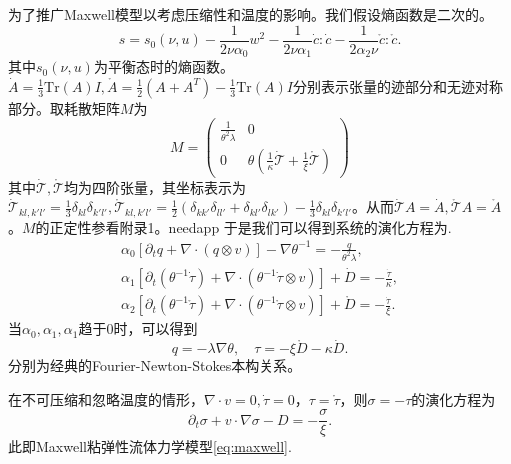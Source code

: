 \documentclass{article}
\begin{document}
	为了推广Maxwell模型以考虑压缩性和温度的影响。我们假设熵函数是二次的。
	\begin{equation*}
		s = s_0(\nu,u)  - \frac{1}{2\nu \alpha_0} w^2 - \frac{1}{2\nu \alpha_1} \dot{c}:\dot{c}- \frac{1}{2\alpha_2 \nu} \mathring{c}:\mathring{c}.
	\end{equation*}
	其中$s_0(\nu,u)$为平衡态时的熵函数。$\dot{A} = \frac{1}{3} \mbox{Tr} (A)I, \mathring{A} = \frac{1}{2} (A + A^T) - \frac{1}{3} \mbox{Tr} (A) I$分别表示张量的迹部分和无迹对称部分。取耗散矩阵$M$为
	\begin{equation*}
		M = \left( \begin{array}{ccc} 
			\frac{1}{\theta^2 \lambda} & 0 \\
			0 &  \theta(\frac{1}{\kappa} \dot{\mathcal{T}} + \frac{1}{\xi} \mathring{\mathcal{T}})  
		\end{array} \right)
	\end{equation*}
	其中$\dot{\mathcal{T}}, \mathring{\mathcal{T}}$均为四阶张量，其坐标表示为$\dot{\mathcal{T}}_{kl,k'l'} = \frac{1}{3}\delta_{kl} \delta_{k'l'}, \mathring{\mathcal{T}}_{kl,k'l'} =\frac{1}{2}(\delta_{kk'}\delta_{ll'} + \delta_{kl'} \delta_{lk'} ) -\frac{1}{3}\delta_{kl} \delta_{k'l'} $。从而$\dot{\mathcal{T}} A = \dot{A},\mathring{\mathcal{T}} A = \mathring{A}$。$M$的正定性参看附录1。needapp
	于是我们可以得到系统的演化方程为\cite{}.
	\begin{subequations}
		\begin{align}
			\alpha_0 [\partial_t q +  \nabla \cdot (q \otimes v)] - \nabla \theta^{-1} = -\frac{q}{\theta^2 \lambda}, \\
			\alpha_1[\partial_t (\theta^{-1} \dot{\tau}) + \nabla \cdot (\theta^{-1} \dot{\tau} \otimes v)] + \dot{D} = -\frac{\dot{\tau}}{\kappa}, \\
			\alpha_2[\partial_t (\theta^{-1} \mathring{\tau}) + \nabla \cdot (\theta^{-1} \mathring{\tau} \otimes v)] + \mathring{D} = -\frac{\dot{\tau}}{\xi}. 
		\end{align}
	\end{subequations}
	当$\alpha_0, \alpha_1, \alpha_1$趋于0时，可以得到
	\begin{equation*}
		q = -\lambda \nabla \theta, \quad \tau = - \xi \mathring{D} - \kappa \dot{D}.
	\end{equation*}
	分别为经典的Fourier-Newton-Stokes本构关系\cite{}。

	在不可压缩和忽略温度的情形，$\nabla \cdot v = 0, \dot{\tau}=0$，$\tau = \mathring{\tau}$，则$\sigma = -\tau$的演化方程为
	\begin{equation*}
		\partial_t \sigma + v \cdot \nabla \sigma - D = -\frac{\sigma}{\xi}. 
	\end{equation*}
	此即Maxwell粘弹性流体力学模型\eqref{eq:maxwell}.	
\end{document}
